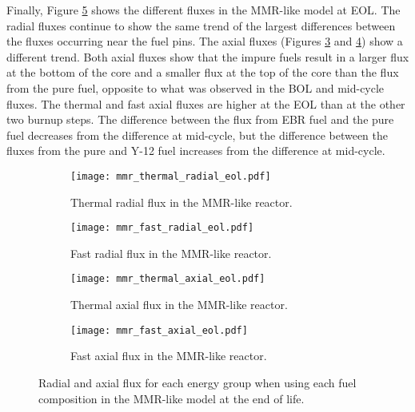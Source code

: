Finally, Figure \ref{fig:mmr_eol} shows the different fluxes in the 
\gls{MMR}-like model at \gls{EOL}. The radial fluxes continue to show 
the same trend of the largest differences between the fluxes occurring near
the fuel pins. The axial fluxes (Figures \ref{fig:mmr_thermal_axial_eol} and 
\ref{fig:mmr_fast_axial_eol}) show a different trend. Both axial 
fluxes show that the impure fuels result in a larger flux at the 
bottom of the core and a smaller flux at the top of the core than the flux 
from the pure fuel, opposite
to what was observed in the \gls{BOL} and mid-cycle fluxes. The thermal 
and fast axial fluxes are higher at the \gls{EOL} than at the other 
two burnup steps. The difference between the flux from \gls{EBR} fuel 
and the pure fuel decreases from the difference at mid-cycle, but the 
difference between the fluxes from the pure and Y-12 fuel 
increases from the difference at mid-cycle. 
   
\begin{figure}
        \centering
        \begin{subfigure}[b]{0.48\textwidth}
            \centering
            \texttt{[image: mmr\_thermal\_radial\_eol.pdf]}
            \caption{Thermal radial flux in the \gls{MMR}-like reactor.}
            \label{fig:mmr_thermal_radial_eol}
        \end{subfigure}
        \hfill
        \begin{subfigure}[b]{0.48\textwidth}
            \centering
            \texttt{[image: mmr\_fast\_radial\_eol.pdf]}
            \caption{Fast radial flux in the \gls{MMR}-like reactor.}
            \label{fig:mmr_fast_radial_eol}
        \end{subfigure}
        \hfill
            
        \begin{subfigure}[b]{0.48\textwidth}
            \centering
            \texttt{[image: mmr\_thermal\_axial\_eol.pdf]}
            \caption{Thermal axial flux in the \gls{MMR}-like reactor. }
            \label{fig:mmr_thermal_axial_eol}
        \end{subfigure}
        \hfill
        \begin{subfigure}[b]{0.48\textwidth}
            \centering
            \texttt{[image: mmr\_fast\_axial\_eol.pdf]}
            \caption{Fast axial flux in the \gls{MMR}-like reactor.}
            \label{fig:mmr_fast_axial_eol}
        \end{subfigure}
        \hfill
        \caption{Radial and axial flux for each energy group when using 
        each fuel composition in the \gls{MMR}-like model at the end 
        of life.}
        \label{fig:mmr_eol}
   \end{figure}


